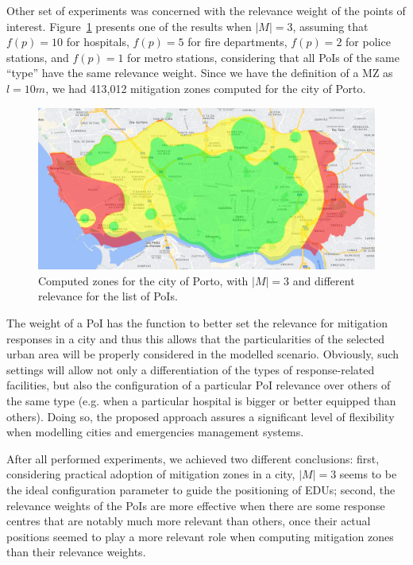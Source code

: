 \begin{refsection}
Other set of experiments was concerned with the relevance weight of the points of interest. Figure~\ref{Fig:zones_porto_3_weight} presents one of the results when $|M|=3$, assuming that $f(p)=10$ for hospitals, $f(p)=5$ for fire departments, $f(p)=2$ for police stations, and $f(p)=1$ for metro stations, considering that all PoIs of the same ``type'' have the same relevance weight. Since we have the definition of a MZ as $l = 10m$, we had 413,012 mitigation zones computed for the city of Porto.

\begin{figure}[ht!]
  \centering
  \includegraphics[width=0.9\linewidth]{Chapters/2-EDUs/images/porto_M3.png}
  \caption{Computed zones for the city of Porto, with $|M|=3$ and different relevance for the list of PoIs.}\label{Fig:zones_porto_3_weight}
\end{figure}

The weight of a PoI has the function to better set the relevance for mitigation responses in a city and thus this allows that the particularities of the selected urban area will be properly considered in the modelled scenario. Obviously, such settings will allow not only a differentiation of the types of response-related facilities, but also the configuration of a particular PoI relevance over others of the same type (e.g. when a particular hospital is bigger or better equipped than others). Doing so, the proposed approach assures a significant level of flexibility when modelling cities and emergencies management systems.

After all performed experiments, we achieved two different conclusions: first, considering practical adoption of mitigation zones in a city, $|M|=3$ seems to be the ideal configuration parameter to guide the positioning of EDUs; second, the relevance weights of the PoIs are more effective when there are some response centres that are notably much more relevant than others, once their actual positions seemed to play a more relevant role when computing mitigation zones than their relevance weights.  


\end{refsection}
